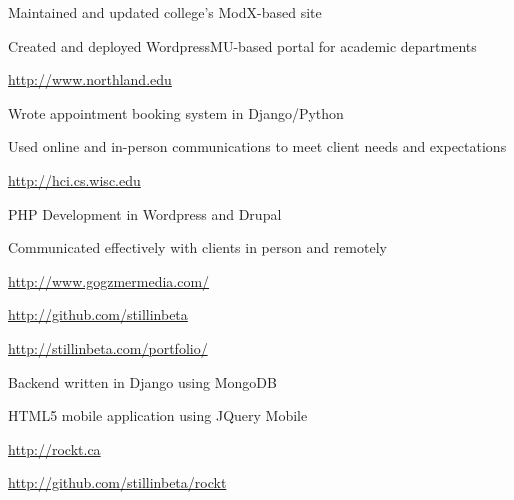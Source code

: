 \documentclass[letterpaper,11pt,notitlepage]{article}
\begin{document}
        \begin{employment}
            \item Maintained and updated college's ModX-based site
            \item Created and deployed WordpressMU-based portal for academic
            departments
            \item \url{http://www.northland.edu}
        \end{employment}
        \begin{employment}
            \item Wrote appointment booking system in Django/Python
            \item Used online and in-person communications to meet client needs
            and expectations
            \item \url{http://hci.cs.wisc.edu}
        \end{employment}
        \begin{employment}
            \item PHP Development in Wordpress and Drupal
            \item Communicated effectively with clients in person and remotely
            \item \url{http://www.gogzmermedia.com/}
        \end{employment}
\vbar
{}
        \begin{employment}
           \item \url{http://github.com/stillinbeta}
        \end{employment}
        \begin{employment}
            \item \url{http://stillinbeta.com/portfolio/}
        \end{employment}
        \begin{employment}
            \item Backend written in Django using MongoDB
            \item HTML5 mobile application using JQuery Mobile
            \item \url{http://rockt.ca}
            \item \url{http://github.com/stillinbeta/rockt}
        \end{employment}
\end{document}
